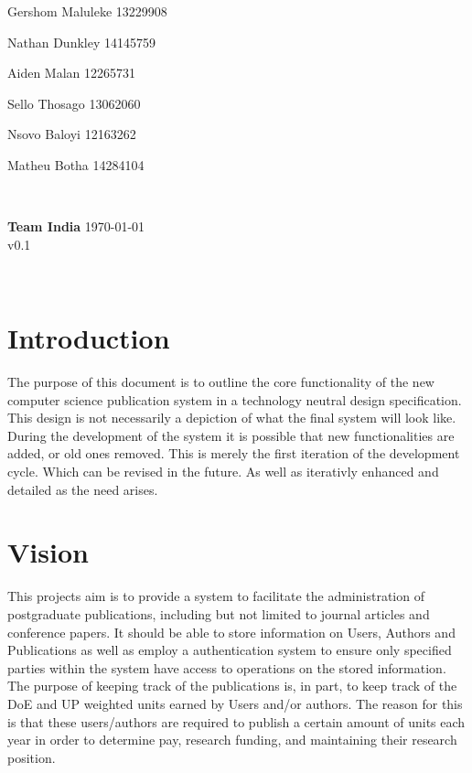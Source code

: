 \documentclass{article}
\begin{document}
\begin{titlepage}
\begin{minipage}{0.5\textwidth}
\begin{flushleft}
	Gershom Maluleke 13229908


	Nathan Dunkley 14145759

	Aiden Malan 12265731

	Sello Thosago 13062060

	Nsovo Baloyi 12163262

	Matheu Botha 14284104
	\end{flushleft}
	\end{minipage}
	~
	\begin{minipage}{0.4\textwidth}
	\begin{flushright} \large
	{ \huge \bfseries Team India }%
	{\large \today}\\
	{\large v0.1}
	\end{flushright}
	\end{minipage}\\[4cm]
\end{titlepage}


	\newpage
	
	\section{Introduction}
	
	The purpose of this document is to outline the core functionality of the new computer science publication system in a technology neutral design specification. This design is not necessarily a depiction of what the final system will look like. During the development of the system it is possible that new functionalities are added, or old ones removed. This is merely the first iteration of the development cycle. Which can be revised in the future. As well as iterativly enhanced and detailed as the need arises. 

	\section{Vision}

	This projects aim is to provide a system to facilitate the administration of postgraduate publications, including but not limited to journal articles and conference papers. It should be able to store information on Users, Authors and Publications as well as employ a authentication system to ensure only specified parties within the system have access to operations on the stored information.
	The purpose of keeping track of the publications is, in part, to keep track of the DoE and UP weighted units earned by Users and/or authors. The reason for this is that these users/authors are required to publish a certain amount of units each year in order to determine pay, research funding, and maintaining their research position.
\end{document}
